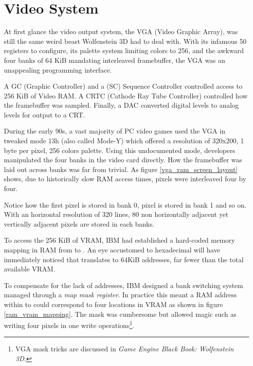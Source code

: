 \section{Video System}
At first glance the video output system, the VGA (Video Graphic Array), was still the same weird beast Wolfenstein 3D had to deal with. With its infamous 50 registers to configure, its palette system limiting colors to 256, and the awkward four banks of 64 KiB mandating interleaved framebuffer, the VGA was an unappealing programming interface.\\
\par
A GC (Graphic Controller) and a (SC) Sequence Controller controlled access to 256 KiB of Video RAM. A CRTC (Cathode Ray Tube Controller) controlled how the framebuffer was sampled. Finally, a DAC converted digital levels to analog levels for output to a CRT.\\
\par 	
{}
\par
During the early 90s, a vast majority of PC video games used the VGA in tweaked mode 13h (also called Mode-Y) which offered a resolution of 320x200, 1 byte per pixel, 256 colors palette. Using this undocumented mode, developers manipulated the four banks in the video card directly. How the framebuffer was laid out across banks was far from trivial. As figure \ref{vga_ram_screen_layout} shows, due to historically slow RAM access times, pixels were interleaved four by four.




\par

Notice how the first pixel  is stored in bank 0, pixel  is stored in bank 1 and so on. With an horizontal resolution of 320 lines, 80 non horizontally adjacent yet vertically adjacent pixels are stored in each banks.\\
\par
To access the 256 KiB of VRAM, IBM had established a hard-coded memory mapping in RAM from  to . An eye accustomed to hexadecimal will have immediately noticed that  translates to 64KiB addresses, far fewer than the total available VRAM.\\
\par
 To compensate for the lack of addresses, IBM designed a bank switching system managed through a \textit{map mask register}. In practice this meant a RAM address within  to  could correspond to four locations in VRAM as shown in figure \ref{ram_vram_mapping}. The mask was cumbersome but allowed magic such as writing four pixels in one write operations\footnote{VGA mask tricks are discussed in \it{Game Engine Black Book: Wolfenstein 3D}.}.



